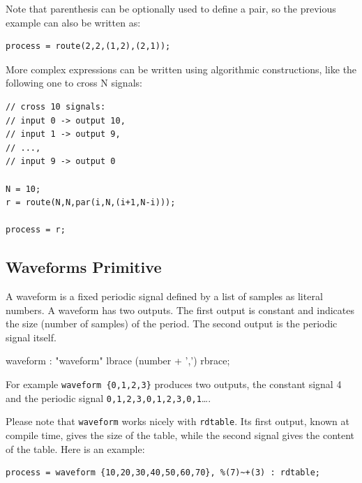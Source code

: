 Note that parenthesis can be optionally used to define a pair, so the previous example can also be written as:

\begin{lstlisting}
process = route(2,2,(1,2),(2,1));
\end{lstlisting}

More complex expressions can be written using algorithmic constructions, like the following one to cross N signals:

\begin{lstlisting}
// cross 10 signals: 
// input 0 -> output 10, 
// input 1 -> output 9, 
// ..., 
// input 9 -> output 0

N = 10;
r = route(N,N,par(i,N,(i+1,N-i)));

process = r;
\end{lstlisting}

\subsection{Waveforms Primitive}

A waveform is a fixed periodic signal defined by a list of samples as literal numbers. A waveform has two outputs. The first output is constant and indicates the size (number of samples) of the period. The second output is the periodic signal itself. 

  \begin{rail}
  waveform : "waveform" lbrace (number + ',') rbrace;
  \end{rail}

For example \lstinline'waveform {0,1,2,3}' produces two outputs, the constant signal 4 and the periodic signal \lstinline'0,1,2,3,0,1,2,3,0,1'\ldots. 

Please note that \lstinline'waveform' works nicely with \lstinline'rdtable'. Its first output, known at compile time, gives the size of the table, while the second signal gives the content of the table. Here is an example:
\begin{lstlisting}
process = waveform {10,20,30,40,50,60,70}, %(7)~+(3) : rdtable;
\end{lstlisting}

\bigskip

